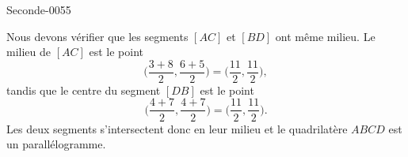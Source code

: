 
\begin{corrige}{Seconde-0055}

    Nous devons vérifier que les segments \( [AC]\) et \( [BD]\) ont même milieu. Le milieu de \( [AC]\) est le point
    \begin{equation}
        \big( \frac{ 3+8 }{ 2 },\frac{ 6+5 }{ 2 } \big)=\big( \frac{ 11 }{2},\frac{ 11 }{2} \big),
    \end{equation}
    tandis que le centre du segment \( [DB]\) est le point
    \begin{equation}
        \big( \frac{ 4+7 }{2},\frac{ 4+7 }{2} \big)=\big( \frac{ 11 }{2},\frac{ 11 }{2} \big).
    \end{equation}
    Les deux segments s'intersectent donc en leur milieu et le quadrilatère \( ABCD\) est un parallélogramme.

\end{corrige}

